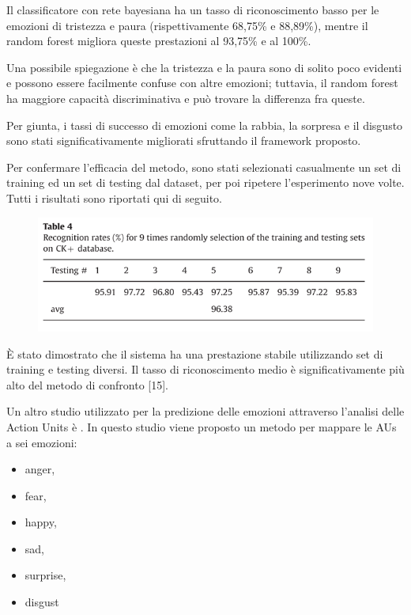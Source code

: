Il classificatore con rete bayesiana ha un tasso di riconoscimento basso per le emozioni di tristezza e paura (rispettivamente 68,75\% e 88,89\%), mentre il random forest migliora queste prestazioni al 93,75\% e al 100\%.

Una possibile spiegazione è che la tristezza e la paura sono di solito poco evidenti e possono essere facilmente confuse con altre emozioni; tuttavia, il random forest ha maggiore capacità discriminativa e può trovare la differenza fra queste. 

Per giunta, i tassi di successo di emozioni come la rabbia, la sorpresa e il disgusto sono stati significativamente migliorati sfruttando il framework proposto. 

Per confermare l'efficacia del metodo, sono stati selezionati casualmente un set di training ed un set di testing dal dataset, per poi ripetere l'esperimento nove volte. Tutti i risultati sono riportati qui di seguito. 
\begin{figure}
    \begin{center}    
        \includegraphics[width=1\linewidth]{images/17.png}
    \end{center}
\end{figure}

È stato dimostrato che il sistema ha una prestazione stabile utilizzando set di training e testing diversi. 
Il tasso di riconoscimento medio è significativamente più alto del metodo di confronto [15].

Un altro studio utilizzato per la predizione delle emozioni attraverso l’analisi delle Action Units è \cite{InferEmoFaceAUs}.
In questo studio viene proposto un metodo per mappare le AUs a sei emozioni:
\begin{itemize}
    \item anger,
    \item fear,
    \item happy,
    \item sad,
    \item surprise,
    \item disgust
\end{itemize}

